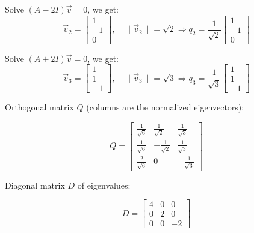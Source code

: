 \documentclass[12pt]{article}
\begin{document}
\begin{enumerate}[leftmargin=0em]
    Solve \( (A - 2I)\vec{v} = 0 \), we get:
    \[
    \vec{v}_2 = \begin{bmatrix} 1 \\ -1 \\ 0 \end{bmatrix}, \quad
    \|\vec{v}_2\| = \sqrt{2}
    \Rightarrow
    q_2 = \frac{1}{\sqrt{2}} \begin{bmatrix} 1 \\ -1 \\ 0 \end{bmatrix}
    \]
    
    Solve \( (A + 2I)\vec{v} = 0 \), we get:
    \[
    \vec{v}_3 = \begin{bmatrix} 1 \\ 1 \\ -1 \end{bmatrix}, \quad
    \|\vec{v}_3\| = \sqrt{3}
    \Rightarrow
    q_3 = \frac{1}{\sqrt{3}} \begin{bmatrix} 1 \\ 1 \\ -1 \end{bmatrix}
    \]
    
    Orthogonal matrix \( Q \) (columns are the normalized eigenvectors):
    
    \[
    Q =
    \begin{bmatrix}
    \frac{1}{\sqrt{6}} & \frac{1}{\sqrt{2}} & \frac{1}{\sqrt{3}} \\
    \frac{1}{\sqrt{6}} & -\frac{1}{\sqrt{2}} & \frac{1}{\sqrt{3}} \\
    \frac{2}{\sqrt{6}} & 0 & -\frac{1}{\sqrt{3}}
    \end{bmatrix}
    \]
    
    Diagonal matrix \( D \) of eigenvalues:
    
    \[
    D = \begin{bmatrix}
    4 & 0 & 0 \\
    0 & 2 & 0 \\
    0 & 0 & -2
    \end{bmatrix}
    \]
    
\end{enumerate}
\end{document}
